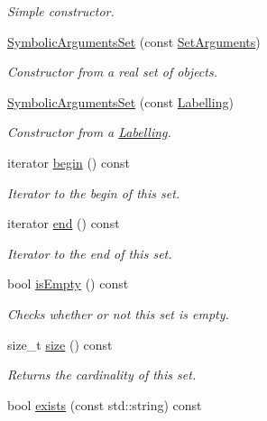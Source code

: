 \begin{DoxyCompactItemize}
\begin{DoxyCompactList}\small\item\em Simple constructor. \end{DoxyCompactList}\item 
\hyperlink{classSymbolicArgumentsSet_a7a7604c19e464d3e15886ee6bdf302bf}{Symbolic\-Arguments\-Set} (const \hyperlink{classSetArguments}{Set\-Arguments})
\begin{DoxyCompactList}\small\item\em Constructor from a real set of objects. \end{DoxyCompactList}\item 
\hyperlink{classSymbolicArgumentsSet_a0cc84042b81c4c2f0f955f4482eca606}{Symbolic\-Arguments\-Set} (const \hyperlink{classLabelling}{Labelling})
\begin{DoxyCompactList}\small\item\em Constructor from a \hyperlink{classLabelling}{Labelling}. \end{DoxyCompactList}\item 
iterator \hyperlink{classSymbolicArgumentsSet_a59a99619c5b304c6f01e132934321c67}{begin} () const 
\begin{DoxyCompactList}\small\item\em Iterator to the begin of this set. \end{DoxyCompactList}\item 
iterator \hyperlink{classSymbolicArgumentsSet_abd40271284aa0d02770f2b057e61a303}{end} () const 
\begin{DoxyCompactList}\small\item\em Iterator to the end of this set. \end{DoxyCompactList}\item 
bool \hyperlink{classSymbolicArgumentsSet_a83e4dcc71db80e28af62724b64c46662}{is\-Empty} () const 
\begin{DoxyCompactList}\small\item\em Checks whether or not this set is empty. \end{DoxyCompactList}\item 
size\-\_\-t \hyperlink{classSymbolicArgumentsSet_ae3bc682d1a405137041fff1e60f5031d}{size} () const 
\begin{DoxyCompactList}\small\item\em Returns the cardinality of this set. \end{DoxyCompactList}\item 
bool \hyperlink{classSymbolicArgumentsSet_a2134e56e21ea277d3dab21433da1962a}{exists} (const std\-::string) const 

\end{DoxyCompactItemize}
